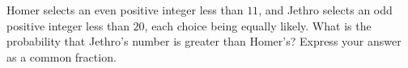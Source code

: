 Homer selects an even positive integer less than $11$, and Jethro selects an odd positive integer less than $20$, each choice being equally likely. What is the probability that Jethro's number is greater than Homer's? Express your answer as a common fraction.
